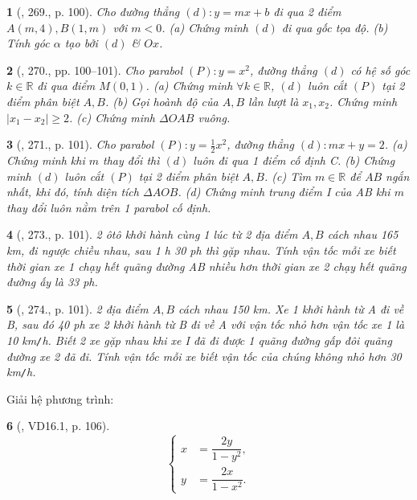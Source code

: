 \documentclass{article}
\newtheorem{baitoan}{}
\begin{document}
\begin{baitoan}[\cite{Tuyen_Toan_9_old}, 269., p. 100]
	Cho đường thẳng $(d):y = mx + b$ đi qua 2 điểm $A(m,4),B(1,m)$ với $m < 0$. (a) Chứng minh $(d)$ đi qua gốc tọa độ. (b) Tính góc $\alpha$ tạo bởi $(d)$ \& $Ox$.
\end{baitoan}

\begin{baitoan}[\cite{Tuyen_Toan_9_old}, 270., pp. 100--101]
	Cho parabol $(P):y = x^2$, đường thẳng $(d)$ có hệ số góc $k\in\mathbb{R}$ đi qua điểm $M(0,1)$. (a) Chứng minh $\forall k\in\mathbb{R}$, $(d)$ luôn cắt $(P)$ tại 2 điểm phân biệt $A,B$. (b) Gọi hoành độ của $A,B$ lần lượt là $x_1,x_2$. Chứng minh $|x_1 - x_2|\ge2$. (c) Chứng minh $\Delta OAB$ vuông.
\end{baitoan}

\begin{baitoan}[\cite{Tuyen_Toan_9_old}, 271., p. 101]
	Cho parabol $(P):y = \frac{1}{2}x^2$, đường thẳng $(d):mx + y = 2$. (a) Chứng minh khi $m$ thay đổi thì $(d)$ luôn đi qua 1 điểm cố định C. (b) Chứng minh $(d)$ luôn cắt $(P)$ tại 2 điểm phân biệt $A,B$. (c) Tìm $m\in\mathbb{R}$ để $AB$ ngắn nhất, khi đó, tính diện tích $\Delta AOB$. (d) Chứng minh trung điểm I của AB khi $m$ thay đổi luôn nằm trên 1 parabol cố định.
\end{baitoan}

\begin{baitoan}[\cite{Tuyen_Toan_9_old}, 273., p. 101]
	2 ôtô khởi hành cùng 1 lúc từ 2 địa điểm $A,B$ cách nhau {\rm165 km}, đi ngược chiều nhau, sau {\rm1 h 30 ph} thì gặp nhau. Tính vận tốc mỗi xe biết thời gian xe 1 chạy hết quãng đường AB nhiều hơn thời gian xe 2 chạy hết quãng đường ấy là {\rm33 ph}.
\end{baitoan}

\begin{baitoan}[\cite{Tuyen_Toan_9_old}, 274., p. 101]
	2 địa điểm $A,B$ cách nhau {\rm150 km}. Xe 1 khởi hành từ A đi về B, sau đó {\rm40 ph} xe 2 khởi hành từ B đi về A với vận tốc nhỏ hơn vận tốc xe 1 là {\rm10 km{\tt/}h}. Biết 2 xe gặp nhau khi xe I đã đi được 1 quãng đường gấp đôi quãng đường xe 2 đã đi. Tính vận tốc mỗi xe biết vận tốc của chúng không nhỏ hơn {\rm30 km{\tt/}h}.
\end{baitoan}
Giải hệ phương trình:

\begin{baitoan}[\cite{TLCT_THCS_Toan_9_dai_so}, VD16.1, p. 106]
	\begin{equation*}
		\left\{\begin{split}
			x &= \dfrac{2y}{1 - y^2},\\
			y &= \dfrac{2x}{1 - x^2}.
		\end{split}\right.
	\end{equation*}
\end{baitoan}
\end{document}
